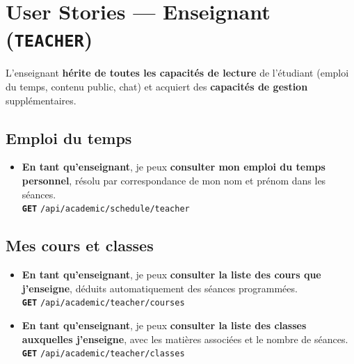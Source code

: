 \documentclass[12pt,a4paper]{article}
\newcommand{\route}[1]{\texorpdfstring{\texttt{\small\color{routeGray}#1}}{#1}}
\newcommand{\httpmethod}[1]{%
  \ifstrequal{#1}{GET}{\colorbox{blue!15}{\texttt{\bfseries\color{blue!70!black}GET}}}{}%
  \ifstrequal{#1}{POST}{\colorbox{green!18}{\texttt{\bfseries\color{green!60!black}POST}}}{}%
  \ifstrequal{#1}{PUT}{\colorbox{orange!18}{\texttt{\bfseries\color{orange!70!black}PUT}}}{}%
  \ifstrequal{#1}{DELETE}{\colorbox{red!15}{\texttt{\bfseries\color{red!70!black}DELETE}}}{}%
}
\newcommand{\usmark}{\color{accentGold}$\blacktriangleright$\;}
\begin{document}
\newpage

\section{User Stories — Enseignant (\texttt{TEACHER})}

\begin{teacherbox}

\begin{infobox}[Héritage]
  L'enseignant \textbf{hérite de toutes les capacités de lecture} de l'étudiant (emploi du temps, contenu public, chat) et acquiert des \textbf{capacités de gestion} supplémentaires.
\end{infobox}

\subsection*{Emploi du temps}

\begin{itemize}[leftmargin=1.2cm, labelsep=0.4cm]
  \item[\usmark] \textbf{En tant qu'enseignant}, je peux \textbf{consulter mon emploi du temps personnel}, résolu par correspondance de mon nom et prénom dans les séances.\\
    \httpmethod{GET} \route{/api/academic/schedule/teacher}
\end{itemize}

\subsection*{Mes cours et classes}

\begin{itemize}[leftmargin=1.2cm, labelsep=0.4cm]
  \item[\usmark] \textbf{En tant qu'enseignant}, je peux \textbf{consulter la liste des cours que j'enseigne}, déduits automatiquement des séances programmées.\\
    \httpmethod{GET} \route{/api/academic/teacher/courses}

  \item[\usmark] \textbf{En tant qu'enseignant}, je peux \textbf{consulter la liste des classes auxquelles j'enseigne}, avec les matières associées et le nombre de séances.\\
    \httpmethod{GET} \route{/api/academic/teacher/classes}
\end{itemize}


\end{teacherbox}
\end{document}
